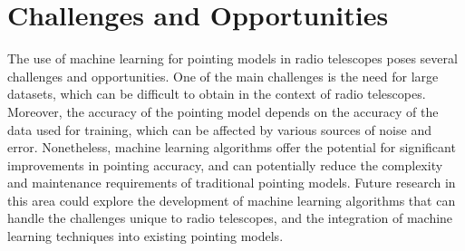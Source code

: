 \section{Challenges and Opportunities}
The use of machine learning for pointing models in radio telescopes poses several challenges and opportunities.
One of the main challenges is the need for large datasets, which can be difficult to obtain in the context of radio telescopes.
Moreover, the accuracy of the pointing model depends on the accuracy of the data used for training, which can be affected by various sources of noise and error.
Nonetheless, machine learning algorithms offer the potential for significant improvements in pointing accuracy,
and can potentially reduce the complexity and maintenance requirements of traditional pointing models.
Future research in this area could explore the development of machine learning algorithms that can handle the challenges unique to radio telescopes,
and the integration of machine learning techniques into existing pointing models.







